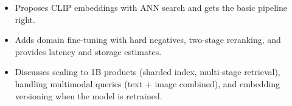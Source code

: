 \begin{interviewq}

\goodgreat
\begin{itemize}
    \item {} Proposes CLIP embeddings with ANN search and gets the basic pipeline right.
    \item {} Adds domain fine-tuning with hard negatives, two-stage reranking, and provides latency and storage estimates.
    \item {} Discusses scaling to 1B products (sharded index, multi-stage retrieval), handling multimodal queries (text + image combined), and embedding versioning when the model is retrained.
\end{itemize}

\end{interviewq}


